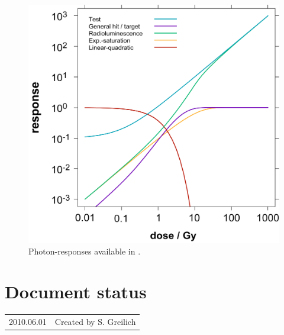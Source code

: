 \begin{figure}
	\centering
		\includegraphics[bb=0 0 2097 1990,width=1.0\textwidth]{pictures/GR.png}
	\caption{Photon-responses available in \la{}.}
	\label{fig:GRs}
\end{figure}


\section*{Document status}
\begin{tabular}{l l}
2010.06.01&Created by S. Greilich
\end{tabular}